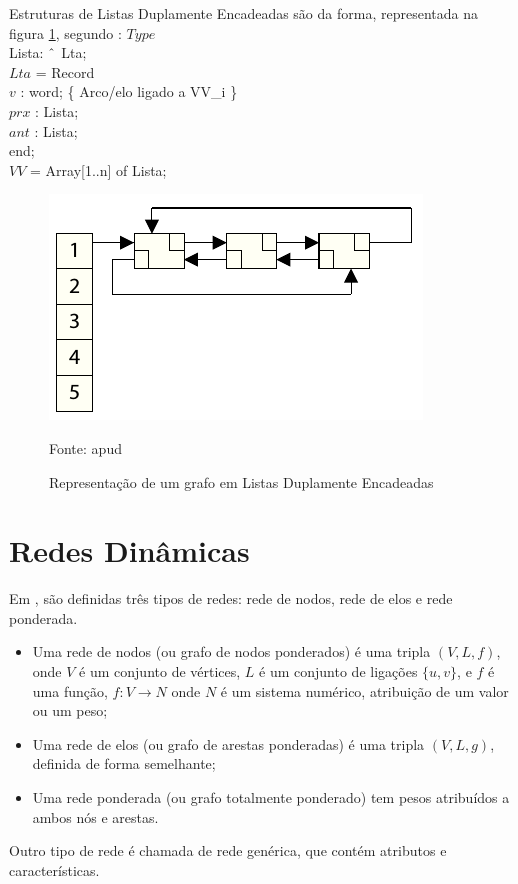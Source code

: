 Estruturas de Listas Duplamente Encadeadas são da forma, representada na figura \ref{fig:listdupla}, segundo \cite{negreirosbook}:
\FloatBarrier
\noindent $Type$\\
Lista: $\string^$ Lta;\\
$Lta$ = Record\\
$v$ : word; \{ Arco/elo ligado a VV\_i \}\\
$prx$ : Lista;\\
$ant$ : Lista;\\
end;\\
$VV$ = Array[1..n] of Lista;\\

\begin{figure}[htbp]
\centering
 \includegraphics[width=.45\textwidth]{chapters/fig/listdupla.png}
\caption{Representação de um grafo em Listas Duplamente Encadeadas}
Fonte: \cite{dynagraph} apud \cite{negreirosbook}
\label{fig:listdupla}
\end{figure}

\FloatBarrier

\section{Redes Dinâmicas}

Em \cite{harary}, são definidas três tipos de redes: rede de nodos, rede de elos e rede ponderada.
\begin{itemize}
\item Uma rede de nodos (ou grafo de nodos ponderados) é uma tripla $(V, L, f)$, onde $V$ é um conjunto
de vértices, $L$ é um conjunto de ligações $\{u,v\}$, e $f$ é uma função, $f: V \rightarrow N$ onde $N$
é um sistema numérico, atribuição de um valor ou um peso;
\item Uma rede de elos (ou grafo de arestas ponderadas) é uma tripla $(V, L, g)$, definida de forma semelhante;
\item Uma rede ponderada (ou grafo totalmente ponderado) tem pesos atribuídos a ambos nós e arestas.
\end{itemize}

Outro tipo de rede é chamada de rede genérica, que contém atributos e características.


